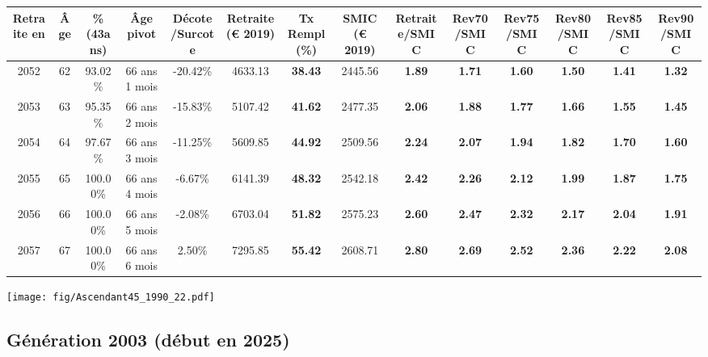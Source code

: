 \begin{adjustbox}{max width=\textwidth} 
\begin{tabular}[htb]{|c|c||c|c|c||c|c||c||c|c|c|c|c|c|} 
\hline 
 Retraite en &  Âge &  \%(43ans) &  Âge pivot &  Décote/Surcote &  Retraite (\euro{} 2019) &  Tx Rempl(\%) &  SMIC (\euro{} 2019) &  Retraite/SMIC &  Rev70/SMIC &  Rev75/SMIC &  Rev80/SMIC &  Rev85/SMIC &  Rev90/SMIC \\ 
\hline \hline 
 2052 &  62 &  93.02\% &  66 ans 1 mois &  -20.42\% &  4633.13 &  {\bf 38.43} &  2445.56 &  {\bf 1.89} &  {\bf 1.71} &  {\bf 1.60} &  {\bf 1.50} &  {\bf 1.41} &  {\bf 1.32} \\ 
\hline 
 2053 &  63 &  95.35\% &  66 ans 2 mois &  -15.83\% &  5107.42 &  {\bf 41.62} &  2477.35 &  {\bf 2.06} &  {\bf 1.88} &  {\bf 1.77} &  {\bf 1.66} &  {\bf 1.55} &  {\bf 1.45} \\ 
\hline 
 2054 &  64 &  97.67\% &  66 ans 3 mois &  -11.25\% &  5609.85 &  {\bf 44.92} &  2509.56 &  {\bf 2.24} &  {\bf 2.07} &  {\bf 1.94} &  {\bf 1.82} &  {\bf 1.70} &  {\bf 1.60} \\ 
\hline 
 2055 &  65 &  100.00\% &  66 ans 4 mois &  -6.67\% &  6141.39 &  {\bf 48.32} &  2542.18 &  {\bf 2.42} &  {\bf 2.26} &  {\bf 2.12} &  {\bf 1.99} &  {\bf 1.87} &  {\bf 1.75} \\ 
\hline 
 2056 &  66 &  100.00\% &  66 ans 5 mois &  -2.08\% &  6703.04 &  {\bf 51.82} &  2575.23 &  {\bf 2.60} &  {\bf 2.47} &  {\bf 2.32} &  {\bf 2.17} &  {\bf 2.04} &  {\bf 1.91} \\ 
\hline 
 2057 &  67 &  100.00\% &  66 ans 6 mois &  2.50\% &  7295.85 &  {\bf 55.42} &  2608.71 &  {\bf 2.80} &  {\bf 2.69} &  {\bf 2.52} &  {\bf 2.36} &  {\bf 2.22} &  {\bf 2.08} \\ 
\hline 
\hline 
\end{tabular} 
\end{adjustbox} 
 
 \vspace{0.1cm} 

 \begin{center}\texttt{[image: fig/Ascendant45\_1990\_22.pdf]}\end{center} \label{fig/Ascendant45_1990_22.pdf} 

\newpage 
 
\subsection{Génération 2003 (début en 2025)} 

